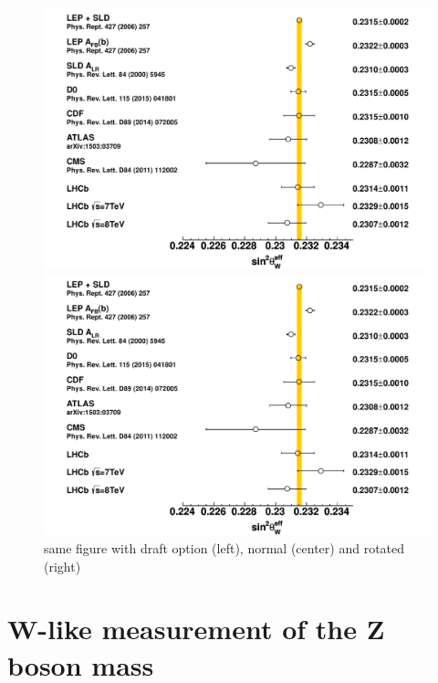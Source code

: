 \documentclass{blois}
\begin{document}
\begin{figure}
\begin{minipage}{0.5\linewidth}
\centerline{\includegraphics[width=0.9\linewidth]{figures/stw_comp_fullref_final}}
\end{minipage}
\hfill
\begin{minipage}{0.5\linewidth}
\centerline{\includegraphics[width=0.9\linewidth]{figures/stw_comp_fullref_final}}
\end{minipage}
\caption[]{same figure with draft option (left), normal (center) and rotated (right)}
\label{fig:sin2theta}
\end{figure}


\section{W-like measurement of the Z boson mass}
\end{document}
